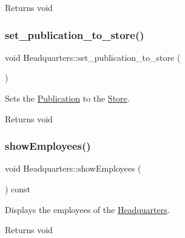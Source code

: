 \begin{DoxyReturn}{Returns}
void 
\end{DoxyReturn}
\mbox{\label{class_headquarters_ae1b2bc854e26b7334169c0bece506646}} 
\subsubsection{\texorpdfstring{set\+\_\+publication\+\_\+to\+\_\+store()}{set\_publication\_to\_store()}}
{\footnotesize\ttfamily void Headquarters\+::set\+\_\+publication\+\_\+to\+\_\+store (\begin{DoxyParamCaption}{ }\end{DoxyParamCaption})}



Sets the \hyperlink{class_publication}{Publication} to the \hyperlink{class_store}{Store}. 

\begin{DoxyReturn}{Returns}
void 
\end{DoxyReturn}
\mbox{\label{class_headquarters_a3dacd649a7dce9de39328bf45fdd79d8}} 
\subsubsection{\texorpdfstring{show\+Employees()}{showEmployees()}}
{\footnotesize\ttfamily void Headquarters\+::show\+Employees (\begin{DoxyParamCaption}{ }\end{DoxyParamCaption}) const}



Displays the employees of the \hyperlink{class_headquarters}{Headquarters}. 

\begin{DoxyReturn}{Returns}
void 
\end{DoxyReturn}
\mbox{\label{class_headquarters_af1bdf66c16fe6b211fffe03a81a69ec2}} 
